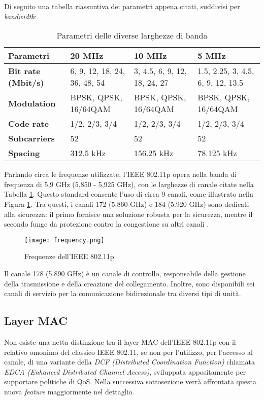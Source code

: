 Di seguito una tabella riassuntiva dei parametri appena citati, suddivisi per \textit{bandwidth}:


\begin{table}[htbp]
    \centering
    \begin{tabular}{|p{7em}|p{7em}|p{7em}|p{7em}|} 
     \hline
     \textbf{Parametri} & \textbf{20 MHz} & \textbf{10 MHz} & \textbf{5 MHz} \\ 
     \hline
     \textbf{Bit rate (Mbit/s)} & 6, 9, 12, 18, 24, 36, 48, 54 & 3, 4.5, 6, 9, 12, 18, 24, 27 & 1.5, 2.25, 3, 4.5, 6, 9, 12, 13.5 \\ 
     \hline
     \textbf{Modulation} & BPSK, QPSK, 16/64QAM & BPSK, QPSK, 16/64QAM & BPSK, QPSK, 16/64QAM \\
     \hline
     \textbf{Code rate} & 1/2, 2/3, 3/4 & 1/2, 2/3, 3/4 & 1/2, 2/3, 3/4 \\
     \hline
     \textbf{Subcarriers} & 52 & 52 & 52 \\
     \hline
     \textbf{Spacing} & 312.5 kHz & 156.25 kHz & 78.125 kHz \\ 
     \hline
    \end{tabular}
    \caption{Parametri delle diverse larghezze di banda}
    \label{table:1}
\end{table}

Parlando circa le frequenze utilizzate, l'IEEE 802.11p opera nella banda di frequenza di 5,9 GHz (5,850 - 5,925 GHz), con le larghezze di canale citate nella Tabella \ref{table:1}. Questo standard consente l'uso di circa 9 canali, come illustrato nella Figura \ref{fig:frequency}. Tra questi, i canali 172 (5.860 GHz) e 184 (5.920 GHz) sono dedicati alla sicurezza: il primo fornisce una soluzione robusta per la sicurezza, mentre il secondo funge da protezione contro la congestione su altri canali \cite{ad_hoc_new}.

\begin{figure}[h!]
    \centering
    \texttt{[image: frequency.png]}
    \caption{Frequenze dell'IEEE 802.11p}
    \label{fig:frequency}
\end{figure}

Il canale 178 (5.890 GHz) è un canale di controllo, responsabile della gestione della trasmissione e della creazione del collegamento. Inoltre, sono disponibili sei canali di servizio per la comunicazione bidirezionale tra diversi tipi di unità.

\subsection[Layer MAC]{Layer MAC}
Non esiste una netta distinzione tra il layer MAC dell'IEEE 802.11p con il relativo omonimo del classico IEEE 802.11, se non per l'utilizzo, per l'accesso al canale, di una variante della \textit{DCF (Distributed Coordination Function)} chiamata \textit{EDCA (Enhanced Distributed Channel Access)}, sviluppata appositamente per supportare politiche di QoS. Nella successiva sottosezione verrà affrontata questa nuova \textit{feature} maggiormente nel dettaglio.


